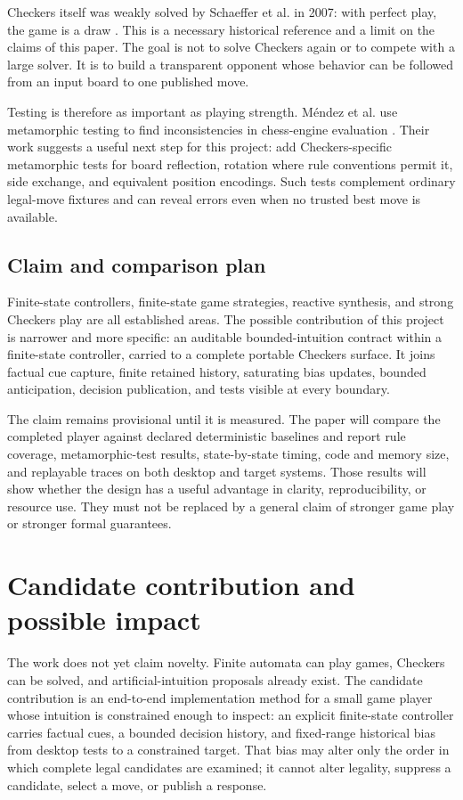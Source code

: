 \documentclass[11pt]{article}
\begin{document}
Checkers itself was weakly solved by Schaeffer et al. in 2007:
with perfect play, the game is a draw \cite{schaeffer2007checkers}. This is a
necessary historical reference and a limit on the claims of this paper. The
goal is not to solve Checkers again or to compete with a large solver. It is
to build a transparent opponent whose behavior can be followed from an input
board to one published move.

Testing is therefore as important as playing strength. Méndez et al. use
metamorphic testing to find inconsistencies in chess-engine evaluation
\cite{mendez2023metamorphic}. Their work suggests a useful next step for this
project: add Checkers-specific metamorphic tests for board reflection,
rotation where rule conventions permit it, side exchange, and equivalent
position encodings. Such tests complement ordinary legal-move fixtures and
can reveal errors even when no trusted best move is available.

\subsection{Claim and comparison plan}

Finite-state controllers, finite-state game strategies, reactive synthesis,
and strong Checkers play are all established areas. The possible contribution
of this project is narrower and more specific: an auditable bounded-intuition
contract within a finite-state controller, carried to a complete portable
Checkers surface. It joins factual cue capture, finite retained history,
saturating bias updates, bounded anticipation, decision publication, and
tests visible at every boundary.

The claim remains provisional until it is measured. The paper will compare
the completed player against declared deterministic baselines and report rule
coverage, metamorphic-test results, state-by-state timing, code and memory
size, and replayable traces on both desktop and target systems. Those results
will show whether the design has a useful advantage in clarity, reproducibility,
or resource use. They must not be replaced by a general claim of stronger
game play or stronger formal guarantees.

\section{Candidate contribution and possible impact}

The work does not yet claim novelty. Finite automata can play games, Checkers
can be solved, and artificial-intuition proposals already exist. The candidate
contribution is an end-to-end implementation method for a small game player
whose intuition is constrained enough to inspect: an explicit finite-state
controller carries factual cues, a bounded decision history, and fixed-range
historical bias from desktop tests to a constrained target. That bias may alter
only the order in which complete legal candidates are examined; it cannot alter
legality, suppress a candidate, select a move, or publish a response.
\end{document}
